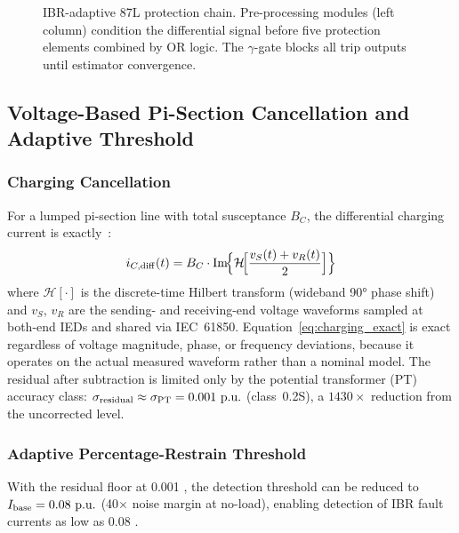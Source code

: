 \documentclass[journal,twoside,10pt]{IEEEtran}
\newcommand{\pu}{\,\text{p.u.}}
\begin{document}
\begin{figure}[!t]
  \centering
  
  \caption{IBR-adaptive 87L protection chain.
           Pre-processing modules (left column) condition the differential
           signal before five protection elements combined by OR logic.
           The $\gamma$-gate blocks all trip outputs until estimator convergence.}
  \label{fig:chain}
\end{figure}

\subsection{Voltage-Based Pi-Section Cancellation and Adaptive Threshold}
\label{sec:correction}

\subsubsection{Charging Cancellation}

For a lumped pi-section line with total susceptance $B_C$, the differential
charging current is exactly~\cite{Blackburn2006}:
\begin{equation}
  i_{C,\rm diff}(t) = B_C \cdot \mathrm{Im}\!\Bigl\{
    \mathcal{H}\!\Bigl[\frac{v_S(t)+v_R(t)}{2}\Bigr]\Bigr\}
  \label{eq:charging_exact}
\end{equation}
where $\mathcal{H}[\cdot]$ is the discrete-time Hilbert transform (wideband
90° phase shift) and $v_S$, $v_R$ are the sending- and receiving-end voltage
waveforms sampled at both-end IEDs and shared via IEC~61850.
Equation~\eqref{eq:charging_exact} is exact regardless of voltage magnitude,
phase, or frequency deviations, because it operates on the actual measured
waveform rather than a nominal model.  The residual after subtraction is
limited only by the potential transformer (PT) accuracy class:
$\sigma_{\rm residual} \approx \sigma_{\rm PT} = 0.001\,\pu$ (class~0.2S),
a $1430\times$ reduction from the uncorrected level.

\subsubsection{Adaptive Percentage-Restrain Threshold}
\label{sec:thresh}

With the residual floor at 0.001\,\pu, the detection threshold can be reduced
to $I_{\rm base} = 0.08\,\pu$ (40$\times$ noise margin at no-load), enabling
detection of IBR fault currents as low as 0.08\,\pu.
\end{document}
